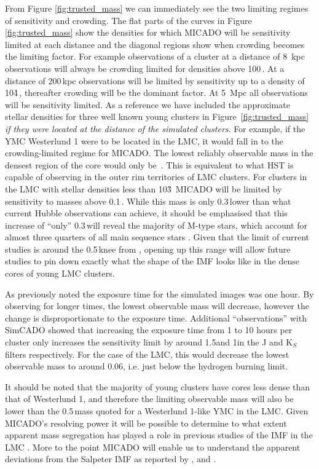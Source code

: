 From Figure \ref{fig:trusted_mass} we can immediately see the two limiting regimes of sensitivity and crowding. 
The flat parts of the curves in Figure \ref{fig:trusted_mass} show the densities for which MICADO will be sensitivity limited at each distance and the diagonal regions show when crowding becomes the limiting factor. 
For example observations of a cluster at a distance of 8\, kpc observations will always be crowding limited for densities above 100\,\spae.
At a distance of 200\,kpc observations will be limited by sensitivity up to a density of 10\h4\,\spa, thereafter crowding will be the dominant factor. 
At 5\, Mpc all observations will be sensitivity limited. 
As a reference we have included the approximate stellar densities for three well known young  clusters in Figure~\ref{fig:trusted_mass} \textit{if they were located at the distance of the simulated clusters}. 
For example, if the YMC Westerlund 1 were to be located in the LMC, it would fall in to the crowding-limited regime for MICADO.
The lowest reliably observable mass in the densest region of the core would only be \,\msun. 
This is equivalent to what HST is capable of observing in the outer rim territories of LMC clusters. For clusters in the LMC with stellar densities less than 10\h3~\spa MICADO will be limited by sensitivity to masses above 0.1\,\msun. 
While this mass is only 0.3\,\msun lower than what current Hubble observations can achieve, it should be emphasised that this increase of ``only'' 0.3\,\msun will reveal the majority of M-type stars, which account for almost three quarters of all main sequence stars \citep{ledrew2001}. 
Given that the limit of current studies is around the 0.5\,\msun knee from \citet{kroupa2001}, opening up this range will allow future studies to pin down exactly what the shape of the IMF looks like in the dense cores of young LMC clusters.

As previously noted the exposure time for the simulated images was one hour. 
By observing for longer times, the lowest observable mass will decrease, however the change is disproportionate to the exposure time. 
Additional ``observations'' with SimCADO showed that increasing the exposure time from 1 to 10 hours per cluster only increases the sensitivity limit by around 1.5\m and 1\m in the J and K$_S$ filters respectively. 
For the case of the LMC, this would decrease the lowest observable mass to around 0.06\msune, i.e. just below the hydrogen burning limit.

It should be noted that the majority of young clusters have cores less dense than that of Westerlund 1, and therefore the limiting observable mass will also be lower than the 0.5\,\msun mass quoted for a Westerlund 1-like YMC in the LMC. 
Given MICADO's resolving power it will be possible to determine to what extent apparent mass segregation has played a role in previous studies of the IMF in the LMC \citep{Ascenso2009-de}.
More to the point MICADO will enable us to understand the apparent deviations from the Salpeter IMF as reported by \citet{dario2009}, \citet{geha2013} and \citet{kalirai2013}.

